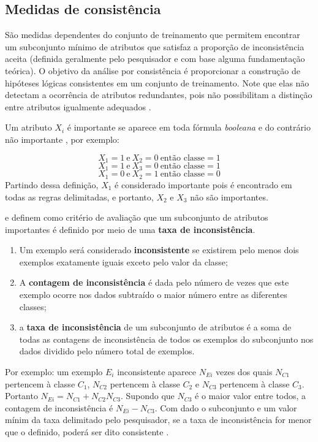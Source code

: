 \documentclass[
  openany]{book}
\begin{document}
\hypertarget{medidas-de-consistuxeancia}{%
\subsection{Medidas de consistência}\label{medidas-de-consistuxeancia}}

São medidas dependentes do conjunto de treinamento que permitem encontrar um subconjunto mínimo de atributos que satisfaz a proporção de inconsistência aceita (definida geralmente pelo pesquisador e com base alguma fundamentação teórica). O objetivo da análise por consistência é proporcionar a construção de hipóteses lógicas consistentes em um conjunto de treinamento. Note que elas não detectam a ocorrência de atributos redundantes, pois não possibilitam a distinção entre atributos igualmente adequados \citep{parmezan2012avaliaccao}.

Um atributo \(X_i\) é importante se aparece em toda fórmula \emph{booleana} e do contrário não importante \citep{almuallim1994learning, lee2005seleccao}, por exemplo:

\[X_1=1 \ \mbox{e} \ X_2=0 \ \mbox{então classe}=1\]
\[X_1=1 \ \mbox{e} \ X_3=0 \ \mbox{então classe}=1\]
\[X_1=0 \ \mbox{e} \ X_2=1 \ \mbox{então classe}=0\]
Partindo dessa definição, \(X_1\) é considerado importante pois é encontrado em todas as regras delimitadas, e portanto, \(X_2\) e \(X_3\) não são importantes.

\citet{dash2003consistency} e \citet{liu1996probabilistic} definem como critério de avaliação que um subconjunto de atributos importantes é definido por meio de uma \textbf{taxa de inconsistência}.

\begin{enumerate}
\def\labelenumi{\arabic{enumi}.}
\item
  Um exemplo será considerado \textbf{inconsistente} se existirem pelo menos dois exemplos exatamente iguais exceto pelo valor da classe;
\item
  A \textbf{contagem de inconsistência} é dada pelo número de vezes que este exemplo ocorre nos dados subtraído o maior número entre as diferentes classes;
\item
  a \textbf{taxa de inconsistência} de um subconjunto de atributos é a soma de todas as contagens de inconsistência de todos os exemplos do subconjunto nos dados dividido pelo número total de exemplos.
\end{enumerate}

Por exemplo: um exemplo \(E_i\) inconsistente aparece \(N_{Ei}\) vezes dos quais \(N_{C1}\) pertencem à classe \(C_1\), \(N_{C2}\) pertencem à classe \(C_2\) e \(N_{C3}\) pertencem à classe \(C_3\). Portanto \(N_{Ei}=N_{C1}+N_{C2}N_{C3}\). Supondo que \(N_{C3}\) é o maior valor entre todos, a contagem de inconsistência é \(N_{Ei}-N_{C3}\). Com dado o subconjunto e um valor mínim da taxa delimitado pelo pesquisador, se a taxa de inconsistência for menor que o definido, poderá ser dito consistente \citep{lee2005seleccao}.
\end{document}
